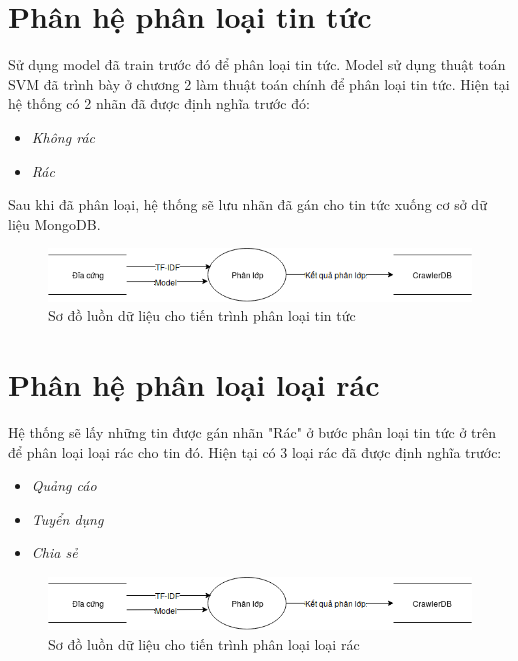 \section{Phân hệ phân loại tin tức}
\label{sec:newsClassify}
Sử dụng model đã train trước đó để phân loại tin tức. Model sử dụng thuật toán SVM đã trình bày ở chương 2 làm thuật toán chính để phân loại tin tức. Hiện tại hệ thống có 2 nhãn đã được định nghĩa trước đó:
	\begin{itemize}
    \item \textit{Không rác}
    \item \textit{Rác}
	\end{itemize}
Sau khi đã phân loại, hệ thống sẽ lưu nhãn đã gán cho tin tức xuống cơ sở dữ liệu MongoDB.

\begin{figure}[H]
	\centering
	\includegraphics[width=0.9\linewidth]{Chapter3/Chapter3Figs/Classify.png}
	\caption{Sơ đồ luồn dữ liệu cho tiến trình phân loại tin tức}
	\label{fig:classifyprocess}
\end{figure}
\section{Phân hệ phân loại loại rác}
\label{sec:spamCategory}
Hệ thống sẽ lấy những tin được gán nhãn "Rác" ở bước phân loại tin tức ở trên để phân loại loại rác cho tin đó. Hiện tại có 3 loại rác đã được định nghĩa trước:
\begin{itemize}
  \item \textit{Quảng cáo}
  \item \textit{Tuyển dụng}
  \item \textit{Chia sẻ}
\end{itemize}

\begin{figure}[H]
	\centering
	\includegraphics[width=0.9\linewidth]{Chapter3/Chapter3Figs/Classify.png}
	\caption{Sơ đồ luồn dữ liệu cho tiến trình phân loại loại rác}
	\label{fig:classifyprocess}
\end{figure}

